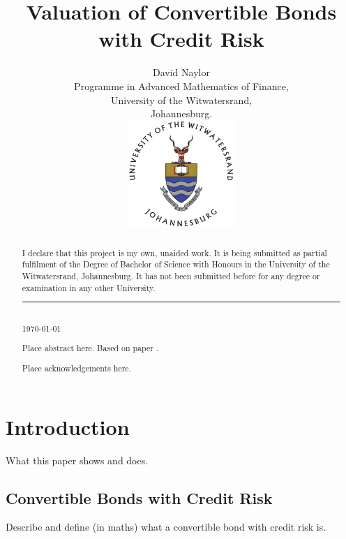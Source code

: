 \documentclass[a4paper,11pt,oneside]{report}
\title{Valuation of Convertible Bonds with Credit Risk}
\author{David Naylor\\[2cm]
Programme in Advanced Mathematics of Finance,\\
University of the Witwatersrand,\\
Johannesburg.\\[2cm]
\includegraphics[width=4cm]{../common/WitsColourLogo}\\[2cm]
}
\newcommand{\setlinespacing}[1]
           {\renewcommand{\baselinestretch}{#1}\small\normalsize}
\theoremstyle{plain}
\theoremstyle{definition}
\begin{document}
\maketitle \setlinespacing{1.20}


\def\abstractname{\Huge Declaration}
\begin{abstract}
I declare that this project is my own, unaided work. It is being submitted as partial fulfilment of the Degree of Bachelor of Science with Honours in the University of the Witwatersrand, Johannesburg. It has not been submitted before for any degree or examination in any other University.\\[3cm]
\noindent\rule{5cm}{0.5pt}\\[1cm]
\noindent \today
\end{abstract}


\def\abstractname{\Huge Abstract}
\begin{abstract}
Place abstract here.  Based on paper \cite{AFV03}.
\end{abstract}


\def\abstractname{\Huge Acknowledgements}
\begin{abstract}
Place acknowledgements here.
\end{abstract}


\setlinespacing{1}
\tableofcontents
\listoffigures
\listoftables
\clearpage
\setlinespacing{1.20}
\setcounter{page}{1}


\chapter{Introduction}
What this paper shows and does.

\section{Convertible Bonds with Credit Risk}
Describe and define (in maths) what a convertible bond with credit risk is.
\end{document}
